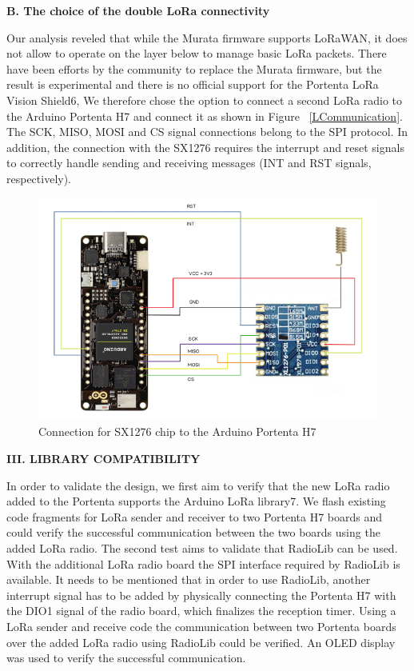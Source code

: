 \textbf{B. The choice of the double LoRa connectivity}\newline

Our analysis reveled that while the Murata firmware supports
LoRaWAN, it does not allow to operate on the layer below to
manage basic LoRa packets. There have been efforts by the
community to replace the Murata firmware, but the result is
experimental and there is no official support for the Portenta
LoRa Vision Shield6,
We therefore chose the option to connect a second LoRa
radio to the Arduino Portenta H7 and connect it as shown in
Figure ~\ref{LCommunication}. The SCK, MISO, MOSI and CS signal connections
belong to the SPI protocol. In addition, the connection with
the SX1276 requires the interrupt and reset signals to correctly
handle sending and receiving messages (INT and RST signals,
respectively). \cite{PortentaLANMAN2022} \newline

\begin{figure}
	\begin{center}
		\includegraphics[width=0.7\linewidth]{Images/LORA/LoRAConnectivity.png}
		\caption{Connection for SX1276 chip to the Arduino Portenta H7}
		\label{LoRAConnectivity} 
	\end{center}
\end{figure} 

\textbf{III. LIBRARY COMPATIBILITY}\newline

 In order to validate the design, we first aim to verify that the
new LoRa radio added to the Portenta supports the Arduino
LoRa library7. We flash existing code fragments for LoRa
sender and receiver to two Portenta H7 boards and could verify
the successful communication between the two boards using
the added LoRa radio.
The second test aims to validate that RadioLib can be used.
With the additional LoRa radio board the SPI interface required
by RadioLib is available. It needs to be mentioned that in order
 to use RadioLib, another interrupt signal has to be added by
physically connecting the Portenta H7 with the DIO1 signal
of the radio board, which finalizes the reception timer. Using
a LoRa sender and receive code the communication between
two Portenta boards over the added LoRa radio using RadioLib
could be verified. An OLED display was used to verify the
successful communication. \cite{PortentaLANMAN2022}\newline


